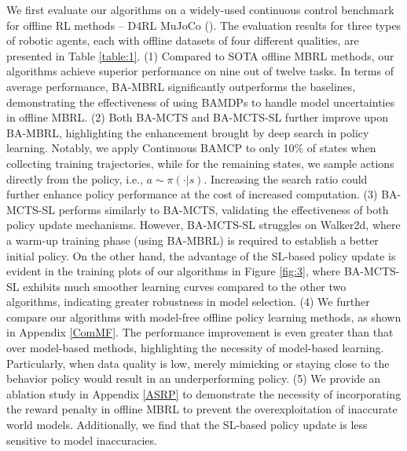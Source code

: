 We first evaluate our algorithms on a widely-used continuous control benchmark for offline RL methods -- D4RL MuJoCo (\cite{DBLP:journals/corr/abs-2004-07219}). The evaluation results for three types of robotic agents, each with offline datasets of four different qualities, are presented in Table \ref{table:1}. (1) Compared to SOTA offline MBRL methods, our algorithms achieve superior performance on nine out of twelve tasks. In terms of average performance, BA-MBRL significantly outperforms the baselines, demonstrating the effectiveness of using BAMDPs to handle model uncertainties in offline MBRL. (2) Both BA-MCTS and BA-MCTS-SL further improve upon BA-MBRL, highlighting the enhancement brought by deep search in policy learning. Notably, we apply Continuous BAMCP to only 10\% of states when collecting training trajectories, while for the remaining states, we sample actions directly from the policy, i.e., $a \sim \pi(\cdot|s)$. Increasing the search ratio could further enhance policy performance at the cost of increased computation. (3) BA-MCTS-SL performs similarly to BA-MCTS, validating the effectiveness of both policy update mechanisms. However, BA-MCTS-SL struggles on Walker2d, where a warm-up training phase (using BA-MBRL) is required to establish a better initial policy. On the other hand, the advantage of the SL-based policy update is evident in the training plots of our algorithms in Figure \ref{fig:3}, where BA-MCTS-SL exhibits much smoother learning curves compared to the other two algorithms, indicating greater robustness in model selection. (4) We further compare our algorithms with model-free offline policy learning methods, as shown in Appendix \ref{ComMF}. The performance improvement is even greater than that over model-based methods, highlighting the necessity of model-based learning. Particularly, when data quality is low, merely mimicking or staying close to the behavior policy would result in an underperforming policy. (5) We provide an ablation study in Appendix \ref{ASRP} to demonstrate the necessity of incorporating the reward penalty in offline MBRL to prevent the overexploitation of inaccurate world models. Additionally, we find that the SL-based policy update is less sensitive to model inaccuracies.

